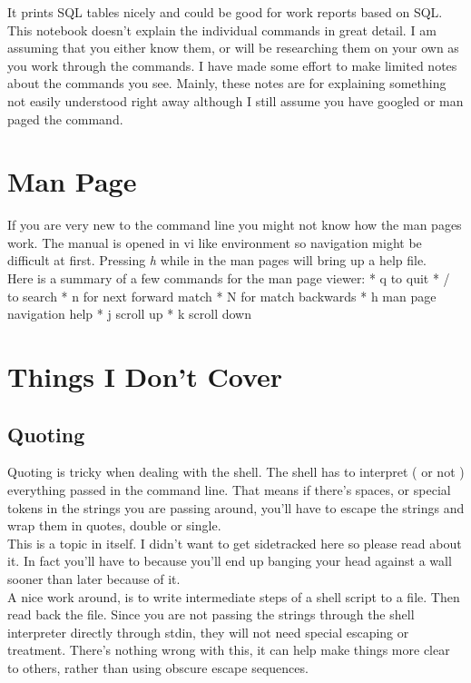 \documentclass{article}
\begin{document}
It prints SQL tables nicely and could be good for work reports based on
SQL. \\


This notebook doesn't explain the individual commands in great detail. I
am assuming that you either know them, or will be researching them on
your own as you work through the commands. I have made some effort to
make limited notes about the commands you see. Mainly, these notes are
for explaining something not easily understood right away although I
still assume you have googled or man paged the command.

    \section{Man Page}\label{man-page}

If you are very new to the command line you might not know how the man
pages work. The manual is opened in vi like environment so navigation
might be difficult at first. Pressing \emph{h} while in the man pages
will bring up a help file. \\

Here is a summary of a few commands for the man page viewer: * q to quit *
/ to search * n for next forward match * N for match backwards * h man
page navigation help * j scroll up * k scroll down

\section{Things I Don't Cover}\label{things-i-dont-cover}

\subsection{Quoting}\label{quoting}

Quoting is tricky when dealing with the shell. The shell has to
interpret ( or not ) everything passed in the command line. That means
if there's spaces, or special tokens in the strings you are passing
around, you'll have to escape the strings and wrap them in quotes,
double or single. \\

This is a topic in itself. I didn't want to get sidetracked here so
please read about it. In fact you'll have to because you'll end up
banging your head against a wall sooner than later because of it.\\

A nice work around, is to write intermediate steps of a shell script to
a file. Then read back the file. Since you are not passing the strings
through the shell interpreter directly through stdin, they will not need
special escaping or treatment. There's nothing wrong with this, it can
help make things more clear to others, rather than using obscure escape
sequences. \\
\end{document}
